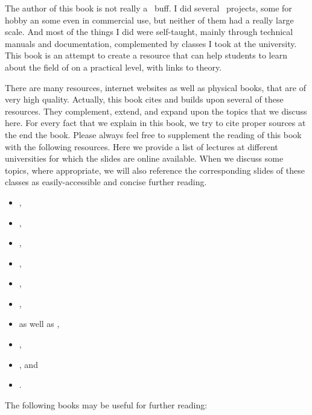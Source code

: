 %
\global\let\oldxyzglslink\glslink%
\protected\gdef\glslink#1#2{#2}%
%
The author of this book is not really a \db\ buff.
I did several \db\ projects, some for hobby an some even in commercial use, but neither of them had a really large scale.
And most of the things I did were self-taught, mainly through technical manuals and documentation, complemented by classes I took at the university.
This book is an attempt to create a resource that can help students to learn about the field of  on a practical level, with links to theory.

There are many resources, internet websites as well as physical books, that are of very high quality.
Actually, this book cites and builds upon several of these resources.
They complement, extend, and expand upon the topics that we discuss here.
For every fact that we explain in this book, we try to cite proper sources at the end the book.
Please always feel free to supplement the reading of this book with the following resources.%
%
%
Here we provide a list of lectures at different universities for which the slides are online available.
When we discuss some topics, where appropriate, we will also reference the corresponding slides of these classes as easily-accessible and concise further reading.%
\begin{itemize}%
\item {},%
\item {},%
\item {},%
\item {},%
\item {},%
\item {},%
\item {} as well as ,%
\item {},%
\item {}, and%
\item {}.%
\end{itemize}%
\endhsection%
%
%
The following books may be useful for further reading:%
